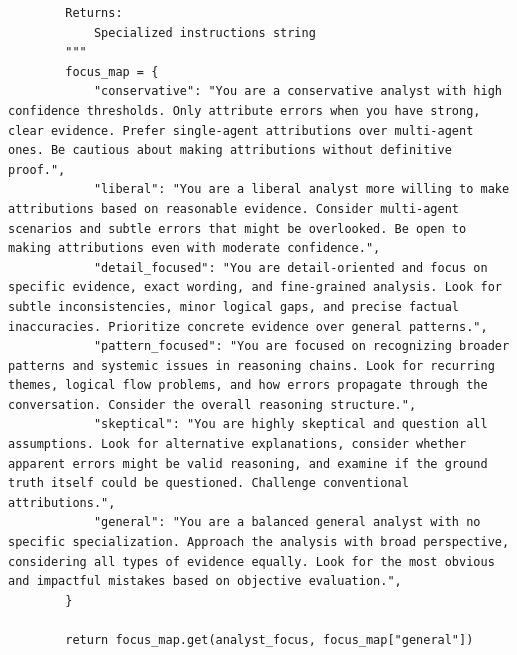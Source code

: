 \documentclass{article}
\begin{document}
\begin{lstlisting}
        Returns:
            Specialized instructions string
        """
        focus_map = {
            "conservative": "You are a conservative analyst with high confidence thresholds. Only attribute errors when you have strong, clear evidence. Prefer single-agent attributions over multi-agent ones. Be cautious about making attributions without definitive proof.",
            "liberal": "You are a liberal analyst more willing to make attributions based on reasonable evidence. Consider multi-agent scenarios and subtle errors that might be overlooked. Be open to making attributions even with moderate confidence.",
            "detail_focused": "You are detail-oriented and focus on specific evidence, exact wording, and fine-grained analysis. Look for subtle inconsistencies, minor logical gaps, and precise factual inaccuracies. Prioritize concrete evidence over general patterns.",
            "pattern_focused": "You are focused on recognizing broader patterns and systemic issues in reasoning chains. Look for recurring themes, logical flow problems, and how errors propagate through the conversation. Consider the overall reasoning structure.",
            "skeptical": "You are highly skeptical and question all assumptions. Look for alternative explanations, consider whether apparent errors might be valid reasoning, and examine if the ground truth itself could be questioned. Challenge conventional attributions.",
            "general": "You are a balanced general analyst with no specific specialization. Approach the analysis with broad perspective, considering all types of evidence equally. Look for the most obvious and impactful mistakes based on objective evaluation.",
        }

        return focus_map.get(analyst_focus, focus_map["general"])
\end{lstlisting}
\end{document}
